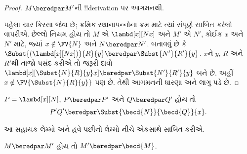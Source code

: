 \documentclass[../../../include/open-logic-section]{subfiles}
\begin{document}
\begin{proof}
  $M \beredpar M'$ની !!{derivation} પર આગમનથી.

  પહેલા ચાર કિસ્સા  જેવા છે;
  ક્રમિક સ્થાનાપન્નોના ક્રમ માટે ત્યાં સંપૂર્ણ સાબિત કરેલો
   વાપરીએ. છેલ્લો નિયમ
   હોય તો
  $M$ એ $\lambd[x][Nx]$ અને $M'$ એ $N'$, કોઈક
  $x$ અને~$N'$ માટે, જ્યાં $x \notin \FV{N}$ અને
  $N \beredpar N'$. બતાવવું છે કે
  $\Subst{(\lambd[x][Nx])}{R}{y} \beredpar
  \Subst{N'}{R'}{y}$. $x$ને $y$, $R$ અને~$R'$થી
  તાજો પસંદ કરીએ તો જરૂરી દાવો
  $\lambd[x][\Subst{N}{R}{y} x] \beredpar
  \Subst{N'}{R'}{y}$ બને છે. અહીં
  $x \notin \FV{\Subst{N}{R}{y}}$ પણ છે.
  તેથી આગમનની ધારણા અને
  લાગુ પડે છે.
\end{proof}

\begin{lem}
  $P=\lambd[x][N]$, $P\beredpar P'$ અને
  $Q\beredpar Q'$ હોય તો
  \[
  P'Q'\beredpar
  \Subst{\becd{N}}{\becd{Q}}{x}.
  \]
\end{lem}
આ સહાયક લેમ્મો અને હવે પછીનો લેમ્મો નીચે એકસાથે સાબિત કરીએ.

\begin{lem}
  $M \beredpar M'$ હોય તો
  $M' \beredpar \becd{M}$.
\end{lem}
\end{document}
